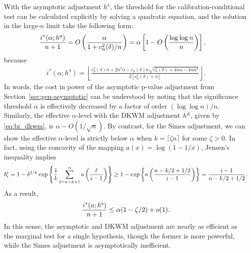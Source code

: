\documentclass[11pt]{article}
\def\dkwm{\textnormal{d}}
\def\simes{\textnormal{s}}
\def\asym{\textnormal{a}}
\begin{document}
With the asymptotic adjustment $h^{\mathrm{a}}$, the threshold for the calibration-conditional test can be calculated explicitly by solving a quadratic equation, and the solution in the large-$n$ limit take the following form:
\begin{align*}
  \frac{i^*(\alpha; h^\asym)}{n+1}
  & = O\left(\frac{\alpha}{1+ c^2_n(\delta)/n}\right) = \alpha \left[ 1 - O \left(\frac{\log \log n}{n} \right) \right],
\end{align*}
because
\begin{align*}
  i^*(\alpha; h^{\mathrm{a}})
    = 
    \left\lfloor\frac{c^2_n(\delta) n + 2 n^2 \alpha - c_n(\delta) n \sqrt{c^2_n(\delta) + 4n \alpha - 4n \alpha^2}}{2 [c^2_n(\delta) + n]}\right\rfloor.
\end{align*}
In words, the cost in power of the asymptotic p-value adjustment from Section~\ref{sec:gen-asymptotic} can be understood by noting that the significance threshold $\alpha$ is effectively decreased by a factor of order $(\log \log n)/n$. Similarly, the effective $\alpha$-level with the DKWM adjustment $h^\dkwm$, given by \eqref{eq:bi_dkwm}, is $\alpha - O(1/\sqrt{n})$. By contrast, for the Simes adjustment, we can show the effective $\alpha$-level is strictly below $\alpha$ when $k = \lceil\zeta n\rceil$ for some $\zeta > 0$. 
In fact, using the concavity of the mapping $a(x) = \log(1 - 1/x)$, Jensen's inequality implies
\begin{equation}\label{eq:bi_simes}
b_{i}^{\simes} = 1 - \delta^{1/k}\exp\left\{\frac{1}{k}\sum_{\ell = n-k+1}^{n}a\left(\frac{\ell}{i - 1}\right)\right\}\ge 1 - \exp\left\{a\left(\frac{n - k / 2 + 1/2}{i - 1}\right)\right\} = \frac{i - 1}{n - k /2 + 1/2}.
\end{equation}
As a result,
\begin{equation}\label{eq:simes_alpha}
\frac{i^{*}(a; h^{\simes})}{n+1} \le  \alpha(1 - \zeta / 2) + o(1).
\end{equation}
In this sense, the asymptotic and DKWM adjustment are nearly as efficient as the marginal test for a single hypothesis, though the former is more powerful, while the Simes adjustment is asymptotically inefficient.
\end{document}
